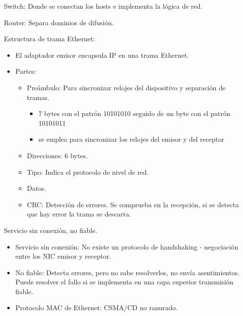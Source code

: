 \documentclass[12pt, twoside, openright]{report} %
\begin{document}
Switch: Donde se conectan los hosts e implementa la lógica de red.

Router: Separa dominios de difusión.

Estructura de trama Ethernet:
\begin{itemize}
	\item El adaptador emisor encapsula IP en una trama Ethernet.
	      \begin{figure}[H]
		      {\def\svgwidth{.9\textwidth}
			      }
	      \end{figure}
	\item Partes:
	      \begin{itemize}
		      \item Preámbulo: Para sincronizar relojes del dispositivo y separación de tramas.
		            \begin{itemize}
			            \item 7 bytes con el patrón 10101010 seguido de un byte con el patrón 10101011
			            \item se emplea para sincronizar los relojes del emisor y del receptor
		            \end{itemize}

		      \item Direcciones: 6 bytes.
		      \item Tipo: Indica el protocolo de nivel de red.
		      \item Datos.
		      \item CRC: Detección de errores. Se comprueba en la recepción, si se detecta que hay error la trama se descarta.
	      \end{itemize}

\end{itemize}


Servicio sin conexión, no fiable.

\begin{itemize}
	\item Servicio sin conexión: No existe un protocolo de handshaking -
	      negociación entre los NIC emisor y receptor.
	\item No fiable: Detecta errores, pero no sabe resolverlos, no envía
	      asentimientos. Puede resolver el fallo si se implementa en una
	      capa superior transmisión fiable.
	\item Protocolo MAC de Ethernet: CSMA/CD no ranurado.
\end{itemize}
\end{document}

